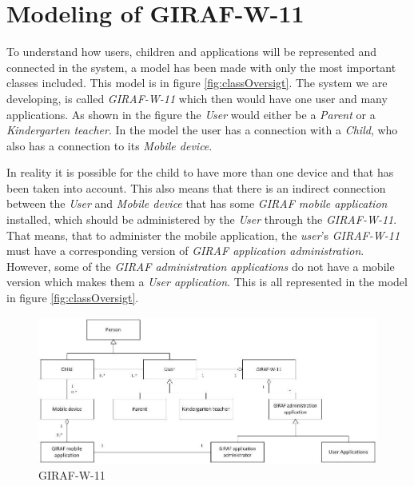 \section{Modeling of GIRAF-W-11}
To understand how users, children and applications will be represented and connected in the system, a model has been made with only the most important classes included. This model is in figure \vref{fig:classOversigt}. The system we are developing, is called \emph{GIRAF-W-11} which then would have one user and many applications. As shown in the figure the \emph{User} would either be a \emph{Parent} or a \emph{Kindergarten teacher}. In the model the user has a connection with a \emph{Child}, who also has a connection to its \emph{Mobile device}.

In reality it is possible for the child to have more than one device and that has been taken into account. This also means that there is an indirect connection between the \emph{User} and \emph{Mobile device} that has some \emph{GIRAF mobile application} installed, which should be administered by the \emph{User} through the \emph{GIRAF-W-11}. That means, that to administer the mobile application, the \emph{user}'s \emph{GIRAF-W-11} must have a corresponding version of \emph{GIRAF application administration}. However, some of the \emph{GIRAF administration applications} do not have a mobile version which makes them a \emph{User application}. This is all represented in the model in figure \vref{fig:classOversigt}.


\begin{figure}[!ht]
	\centering
		\includegraphics[width=1.00\textwidth]{img/classOversigt.jpg}
	\caption{GIRAF-W-11}
	\label{fig:classOversigt}
\end{figure}
\newpage